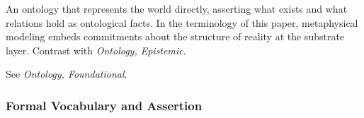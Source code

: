 \begin{description}[style=nextline,leftmargin=1.5cm]
\item[Ontology, Metaphysical]
An ontology that represents the world directly,
asserting what exists and what relations hold
as ontological facts.
In the terminology of this paper,
metaphysical modeling embeds commitments about
the structure of reality at the substrate layer.
Contrast with \emph{Ontology, Epistemic}.

\item[Ontology, Upper]
See \emph{Ontology, Foundational}.

\end{description}

\subsubsection*{Formal Vocabulary and Assertion}

